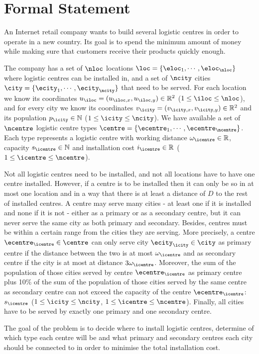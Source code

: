 \section{Formal Statement}

An Internet retail company wants to build several logistic centres in order to operate
in a new country. Its goal is to spend the minimum amount of money while making sure that
customers receive their products quickly enough.

\hfill

The company has a set of $\nloc$ locations $\loc = \{\eloc_1, \cdots, \eloc_\nloc\}$ where
logistic centres can be installed in, and a set of $\ncity$ cities $\city = \{\ecity_1,
\cdots, \ecity_\ncity\}$ that need to be served. For each location we know its coordinates
$u_\iloc = (u_{\iloc, x}, u_{\iloc, y}) \in \mathbb{R}^2$ ($1 \le \iloc \le \nloc$), and for
every city we know its coordinates $v_\icity = (v_{\icity, x}, v_{\icity, y}) \in
\mathbb{R}^2$ and its population $p_\icity \in \mathbb{N}$ ($1 \le \icity \le \ncity$). We
have available a set of $\ncentre$ logistic centre types $\centre = \{\ecentre_1, \cdots,
\ecentre_\ncentre\}$. Each type represents a logistic centre with working distance
$\omega_\icentre \in \mathbb{R}$, capacity $s_\icentre \in \mathbb{N}$ and installation cost
$i_\icentre \in \mathbb{R}$ ($1 \le \icentre \le \ncentre$).

\hfill

Not all logistic centres need to be installed, and not all locations have to have one centre
installed. However, if a centre is to be installed then it can only be so in at most one
location and in a way that there is at least a distance of $D$ to the rest of installed
centres. A centre may serve many cities - at least one if it is installed and none if it is
not - either as a primary or as a secondary centre, but it can never serve the same city as
both primary and secondary. Besides, centres must be within a certain range from the cities
they are serving. More precisely, a centre $\ecentre_\icentre \in \centre$ can only serve
city $\ecity_\icity \in \city$ as primary centre if the distance between the two is at most
$\omega_\icentre$ and as secondary centre if the city is at most at distance $3\omega_\icentre$.
Moreover, the sum of the population of those cities served by centre $\ecentre_\icentre$ as
primary centre plus 10\% of the sum of the population of those cities served by the same
centre as secondary centre can not exceed the capacity of the centre $\ecentre_\icentre$:
$s_\icentre$ ($1 \le \icity \le \ncity$, $1 \le \icentre \le \ncentre$). Finally, all cities
have to be served by exactly one primary and one secondary centre.

\hfill

The goal of the problem is to decide where to install logistic centres, determine of
which type each centre will be and what primary and secondary centres each city should
be connected to in order to minimise the total installation cost.



